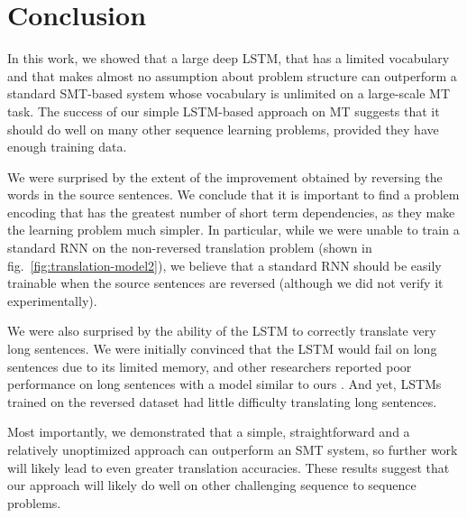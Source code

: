 \section{Conclusion}

In this work, we showed that a large deep LSTM, that has a limited 
vocabulary and that makes almost no
assumption about problem structure can outperform a standard SMT-based system whose vocabulary
is unlimited on a large-scale MT task.  The success of our simple
LSTM-based approach on MT suggests that it should do well on many
other sequence learning problems, provided they have enough training
data.

We were surprised by the extent of the improvement obtained by
reversing the words in the source sentences.  We conclude that it is
important to find a problem encoding that has the greatest number of
short term dependencies, as they make the learning problem much
simpler.  In particular, while we were unable to train a standard
RNN on the non-reversed translation problem (shown in
fig.~\ref{fig:translation-model2}), we believe that a standard RNN
should be easily trainable when the source sentences are reversed (although we
did not verify it experimentally).

We were also surprised by the ability of the LSTM to correctly
translate very long sentences.  We were initially convinced that the
LSTM would fail on long sentences due to its limited memory, and other
researchers reported poor performance on long sentences with a model
similar to ours \cite{cho14,bog14,curse}.  And yet,
LSTMs trained on the reversed dataset had little difficulty translating long
sentences.

Most importantly, we demonstrated that a simple, straightforward and a
relatively unoptimized approach can outperform an SMT system, so
further work will likely lead to even greater translation accuracies.  
These results suggest that our approach will likely   
do well on other challenging sequence to sequence problems.
